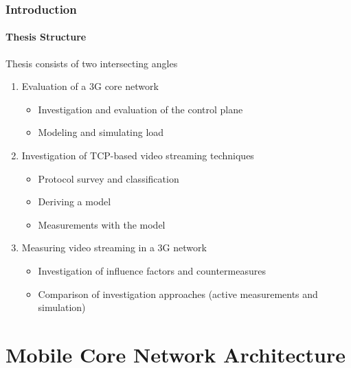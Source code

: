 \documentclass{beamer}
\begin{document}
\begin{frame}
	\frametitle{Introduction}
	\framesubtitle{Thesis Structure}

	Thesis consists of two intersecting angles
	\begin{enumerate}
		\item Evaluation of a 3G core network
			\begin{itemize}
				\item Investigation and evaluation of the control plane
				\item Modeling and simulating load
			\end{itemize}

		\item Investigation of TCP-based video streaming techniques
			\begin{itemize}
				\item Protocol survey and classification
				\item Deriving a model
				\item Measurements with the model
			\end{itemize}

		\item Measuring video streaming in a 3G network 
			\begin{itemize}
				\item Investigation of influence factors and countermeasures
				\item Comparison of investigation approaches (active measurements and simulation)
			\end{itemize}
	\end{enumerate}


\end{frame}






\section{Mobile Core Network Architecture}
\end{document}
